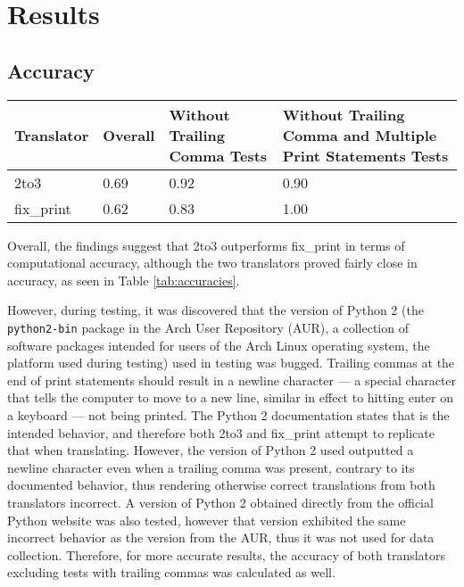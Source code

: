 \section{Results}

\subsection{Accuracy}
\begin{table*}[hbt!]
    \centering
    \begin{tabular}{@{}l|lll@{}}
    \toprule
    Translator & Overall & Without Trailing Comma Tests & Without Trailing Comma and Multiple Print Statements Tests \\ \midrule
    2to3       & 0.69                         & 0.92                                      & 0.90                                                                             \\
    fix\_print & 0.62                          & 0.83                                      & 1.00                                                                               \\ \bottomrule
    \end{tabular}
    \caption{Computational accuracy of 2to3 and fix\_print.}
    \label{tab:accuracies}
\end{table*}

Overall, the findings suggest that 2to3 outperforms fix\_print in terms of computational accuracy, although the two translators proved fairly close in accuracy, as seen in Table \ref{tab:accuracies}.

However, during testing, it was discovered that the version of Python 2 (the \verb|python2-bin| package in the Arch User Repository (AUR), a collection of software packages intended for users of the Arch Linux operating system, the platform used during testing) used in testing was bugged. Trailing commas at the end of print statements should result in a newline character --- a special character that tells the computer to move to a new line, similar in effect to hitting enter on a keyboard --- not being printed. The Python 2 documentation states that is the intended behavior, and therefore both 2to3 and fix\_print attempt to replicate that when translating. However, the version of Python 2 used outputted a newline character even when a trailing comma was present, contrary to its documented behavior, thus rendering otherwise correct translations from both translators incorrect. A version of Python 2 obtained directly from the official Python website was also tested, however that version exhibited the same incorrect behavior as the version from the AUR, thus it was not used for data collection. Therefore, for more accurate results, the accuracy of both translators excluding tests with trailing commas was calculated as well.

